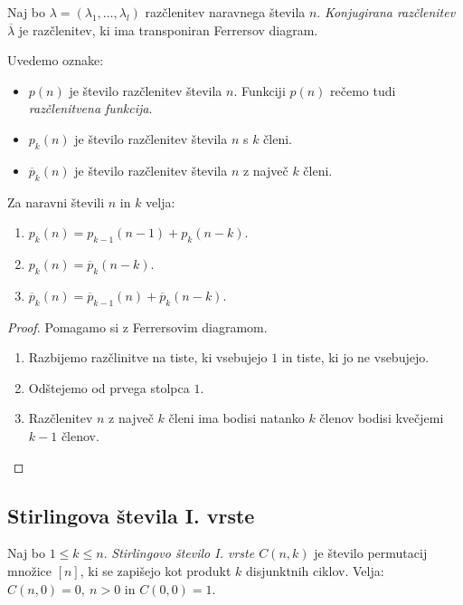 \begin{definicija}
    Naj bo $\lambda = (\lambda_1, \ldots, \lambda_l)$ razčlenitev naravnega števila $n$. \emph{Konjugirana razčlenitev $\overline{\lambda}$} je razčlenitev, ki ima transponiran Ferrersov diagram.
\end{definicija}

Uvedemo oznake:
\begin{itemize}
    \item $p(n)$ je število razčlenitev števila $n$. Funkciji $p(n)$ rečemo tudi \emph{razčlenitvena funkcija}.
    \item $p_k(n)$ je število razčlenitev števila $n$ s $k$ členi.
    \item $\overline{p}_k(n)$ je število razčlenitev števila $n$ z največ $k$ členi.
\end{itemize}

\begin{trditev}
    Za naravni števili $n$ in $k$ velja:
    \begin{enumerate}
        \item $p_k(n) = p_{k-1}(n-1) + p_k(n-k)$.
        \item $p_k(n) = \overline{p}_k(n-k)$.
        \item $\overline{p}_k(n) = \overline{p}_{k-1}(n) + \overline{p}_k(n-k)$.
    \end{enumerate}
\end{trditev}

\begin{proof}
    Pomagamo si z Ferrersovim diagramom.
    \begin{enumerate}
        \item Razbijemo razčlinitve na tiste, ki vsebujejo $1$ in tiste, ki jo ne vsebujejo.
        \item Odštejemo od prvega stolpca $1$.
        \item Razčlenitev $n$ z največ $k$ členi ima bodisi natanko $k$ členov bodisi kvečjemi $k-1$ členov. \qedhere
    \end{enumerate}
\end{proof}

\subsection{Stirlingova števila I. vrste}
\begin{definicija}
    Naj bo $1 \leq k \leq n$. \emph{Stirlingovo število I. vrste $C(n,k)$} je število permutacij množice $[n]$, ki se zapišejo kot produkt $k$ disjunktnih ciklov.
    Velja: $C(n, 0) = 0, \ n > 0$ in $C(0,0) = 1$.
\end{definicija}

